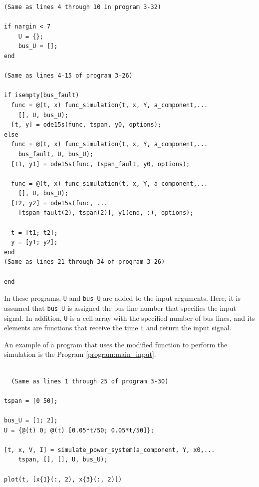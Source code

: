 \documentclass[graybox, envcountchap]{svmult}
\begin{document}
\begin{example}
\begin{PROGRAMA}[count,title={simulate\_power\_system.m}]
\begin{verbatim}
(Same as lines 4 through 10 in program 3-32)

if nargin < 7
    U = {};
    bus_U = [];
end

(Same as lines 4-15 of program 3-26)

if isempty(bus_fault)
  func = @(t, x) func_simulation(t, x, Y, a_component,...
    [], U, bus_U);
  [t, y] = ode15s(func, tspan, y0, options);
else
  func = @(t, x) func_simulation(t, x, Y, a_component,...
    bus_fault, U, bus_U);
  [t1, y1] = ode15s(func, tspan_fault, y0, options);
  
  func = @(t, x) func_simulation(t, x, Y, a_component,...
    [], U, bus_U);
  [t2, y2] = ode15s(func, ...
    [tspan_fault(2), tspan(2)], y1(end, :), options);
  
  t = [t1; t2];
  y = [y1; y2];
end
(Same as lines 21 through 34 of program 3-26)

end
\end{verbatim}
\end{PROGRAMA}

In these programs, \verb|U| and \verb|bus_U| are added to the input arguments.
Here, it is assumed that \verb|bus_U| is assigned the bus line number that specifies the input signal.
In addition, \verb|U| is a cell array with the specified number of bus lines, and its elements are functions that receive the time \verb|t| and return the input signal.

An example of a program that uses the modified function to perform the simulation is the Program \nobreak\ref{program:main_input}.

\smallskip
\begin{PROGRAMA}[count,title={main\_simulation\_3bus\_input.m}]\label{program:main_input}
\begin{verbatim}

  (Same as lines 1 through 25 of program 3-30)

tspan = [0 50];

bus_U = [1; 2];
U = {@(t) 0; @(t) [0.05*t/50; 0.05*t/50]};

[t, x, V, I] = simulate_power_system(a_component, Y, x0,...
    tspan, [], [], U, bus_U);

plot(t, [x{1}(:, 2), x{3}(:, 2)])
  \end{verbatim}
\end{PROGRAMA}


\end{example}
\end{document}
